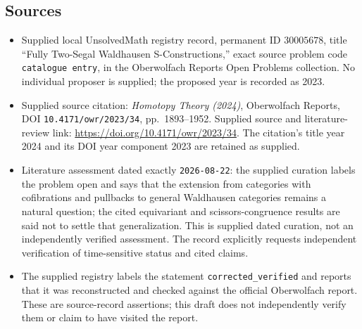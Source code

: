 \documentclass[11pt]{article}
\begin{document}
\subsection{Sources}
\begin{itemize}
\item Supplied local UnsolvedMath registry record, permanent ID \(30005678\), title ``Fully Two-Segal Waldhausen S-Constructions,'' exact source problem code \texttt{catalogue entry}, in the Oberwolfach Reports Open Problems collection. No individual proposer is supplied; the proposed year is recorded as 2023.
\item Supplied source citation: \emph{Homotopy Theory (2024)}, Oberwolfach Reports, DOI \texttt{10.4171/owr/2023/34}, pp.\ 1893--1952. Supplied source and literature-review link: \url{https://doi.org/10.4171/owr/2023/34}. The citation's title year 2024 and its DOI year component 2023 are retained as supplied.
\item Literature assessment dated exactly \texttt{2026-08-22}: the supplied curation labels the problem open and says that the extension from categories with cofibrations and pullbacks to general Waldhausen categories remains a natural question; the cited equivariant and scissors-congruence results are said not to settle that generalization. This is supplied dated curation, not an independently verified assessment. The record explicitly requests independent verification of time-sensitive status and cited claims.
\item The supplied registry labels the statement \texttt{corrected\_verified} and reports that it was reconstructed and checked against the official Oberwolfach report. These are source-record assertions; this draft does not independently verify them or claim to have visited the report.
\end{itemize}
\end{document}
